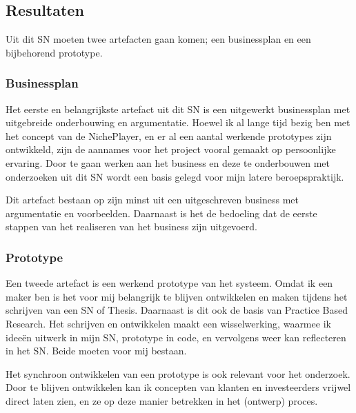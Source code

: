 \subsection{Resultaten}
Uit dit SN moeten twee artefacten gaan komen; een businessplan en een bijbehorend prototype.

\subsubsection*{Businessplan}
Het eerste en belangrijkste artefact uit dit SN is een uitgewerkt businessplan met uitgebreide onderbouwing en argumentatie. Hoewel ik al lange tijd bezig ben met het concept van de NichePlayer, en er al een aantal werkende prototypes zijn ontwikkeld, zijn de aannames voor het project vooral gemaakt op persoonlijke ervaring. Door te gaan werken aan het business en deze te onderbouwen met onderzoeken uit dit SN wordt een basis gelegd voor mijn latere beroepspraktijk.

Dit artefact bestaan op zijn minst uit een uitgeschreven business met argumentatie en voorbeelden. Daarnaast is het de bedoeling dat de eerste stappen van het realiseren van het business zijn uitgevoerd.

\subsubsection*{Prototype}
Een tweede artefact is een werkend prototype van het systeem. Omdat ik een maker ben is het voor mij belangrijk te blijven ontwikkelen en maken tijdens het schrijven van een SN of Thesis. Daarnaast is dit ook de basis van Practice Based Research. Het schrijven en ontwikkelen maakt een wisselwerking, waarmee ik ideeën uitwerk in mijn SN, prototype in code, en vervolgens weer kan reflecteren in het SN. Beide moeten voor mij bestaan.

Het synchroon ontwikkelen van een prototype is ook relevant voor het onderzoek. Door te blijven ontwikkelen kan ik concepten van klanten en investeerders vrijwel direct laten zien, en ze op deze manier betrekken in het (ontwerp) proces.

